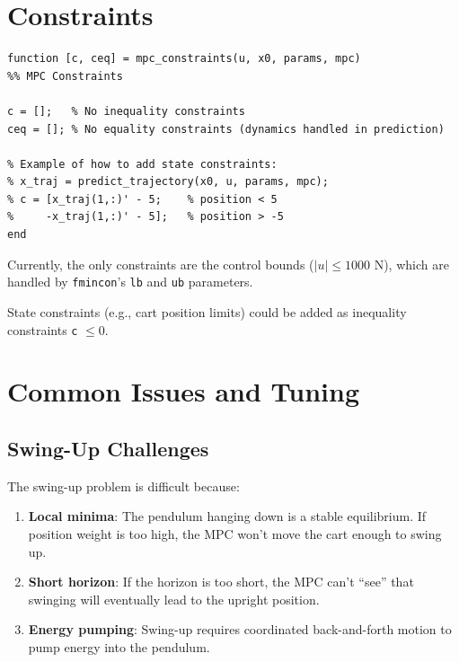 \documentclass[11pt]{article}
\begin{document}
\section{Constraints}

\begin{lstlisting}
function [c, ceq] = mpc_constraints(u, x0, params, mpc)
%% MPC Constraints

c = [];   % No inequality constraints
ceq = []; % No equality constraints (dynamics handled in prediction)

% Example of how to add state constraints:
% x_traj = predict_trajectory(x0, u, params, mpc);
% c = [x_traj(1,:)' - 5;    % position < 5
%     -x_traj(1,:)' - 5];   % position > -5
end
\end{lstlisting}

Currently, the only constraints are the control bounds ($|u| \leq 1000$ N), which are handled by \texttt{fmincon}'s \texttt{lb} and \texttt{ub} parameters.

State constraints (e.g., cart position limits) could be added as inequality constraints \texttt{c} $\leq 0$.

\section{Common Issues and Tuning}

\subsection{Swing-Up Challenges}

The swing-up problem is difficult because:
\begin{enumerate}
    \item \textbf{Local minima}: The pendulum hanging down is a stable equilibrium. If position weight is too high, the MPC won't move the cart enough to swing up.

    \item \textbf{Short horizon}: If the horizon is too short, the MPC can't ``see'' that swinging will eventually lead to the upright position.

    \item \textbf{Energy pumping}: Swing-up requires coordinated back-and-forth motion to pump energy into the pendulum.
\end{enumerate}
\end{document}
